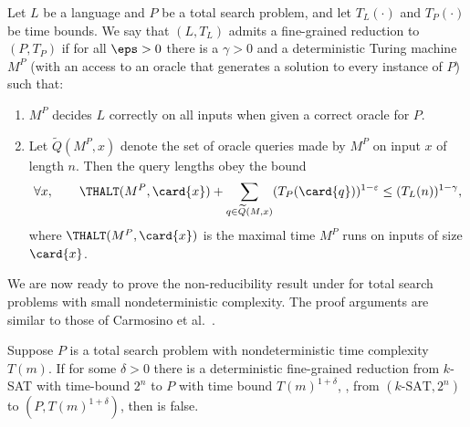 \begin{definition}
Let $L$ be a language and $P$ be a total search problem, and let $T_L(\cdot)$ and $T_P(\cdot)$ be time bounds. We say that $(L,T_L)$ admits a fine-grained reduction to $(P,T_P)$ if for all $\eps>0$ there is a $\gamma>0$ and a deterministic Turing machine $M^P$ (with an access to an oracle that generates a solution to every instance of $P$) such that:

\begin{enumerate}
\item \label{itit:a}
	$M^P$ decides $L$ correctly on all inputs when given a correct oracle for $P$.
\item \label{itit:b}
  Let %
$\widetilde{Q}(M^P,x)$    %
denote the set of oracle queries made by $M^P$ on input $x$ of length $n$. Then the query lengths obey the bound
%
$$
\forall x, \qquad
\THALT(M^P,\card{x}) + \sum_{q\in \widetilde{Q}(M,x)}(T_P(\card{q}))^{1-\varepsilon}
\leq(T_L(n))^{1-\gamma},
$$
where $\THALT(M^P,\card{x})$ is the maximal time $M^P$ runs on  inputs of size $\card{x}$.
\end{enumerate}
\end{definition}
We are now ready to prove the non-reducibility result under \NSETH for total search problems with small nondeterministic complexity. The proof
arguments are similar to those of Carmosino et al.~\cite{carmosino2016nondeterministic}.

\begin{theorem}\label{nondet:if}
Suppose $P$ is a total search problem with nondeterministic time complexity $T(m)$.
If for some $\delta>0$ there is a deterministic fine-grained reduction from $k$-SAT with time-bound $2^n$ to $P$ with time bound $T(m)^{1+\delta}$, \ie, from $(k\text{-SAT},2^n)$ to $(P,T(m)^{1+\delta})$, then \NSETH is false.
\end{theorem}

